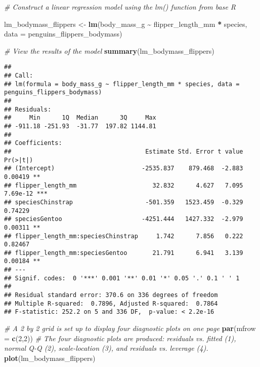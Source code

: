 \documentclass[
]{article}
\newenvironment{Shaded}{\begin{snugshade}}{\end{snugshade}}
\newcommand{\AttributeTok}[1]{\textcolor[rgb]{0.13,0.29,0.53}{#1}}
\newcommand{\CommentTok}[1]{\textcolor[rgb]{0.56,0.35,0.01}{\textit{#1}}}
\newcommand{\DecValTok}[1]{\textcolor[rgb]{0.00,0.00,0.81}{#1}}
\newcommand{\FunctionTok}[1]{\textcolor[rgb]{0.13,0.29,0.53}{\textbf{#1}}}
\newcommand{\NormalTok}[1]{#1}
\newcommand{\OtherTok}[1]{\textcolor[rgb]{0.56,0.35,0.01}{#1}}
\newcommand{\SpecialCharTok}[1]{\textcolor[rgb]{0.81,0.36,0.00}{\textbf{#1}}}
\begin{document}
\begin{Shaded}
\begin{Highlighting}[]
\CommentTok{\# Construct a linear regression model using the lm() function from base R}

\NormalTok{lm\_bodymass\_flippers }\OtherTok{\textless{}{-}} \FunctionTok{lm}\NormalTok{(body\_mass\_g }\SpecialCharTok{\textasciitilde{}}\NormalTok{ flipper\_length\_mm }\SpecialCharTok{*}\NormalTok{ species, }\AttributeTok{data =}\NormalTok{ penguins\_flippers\_bodymass)}

\CommentTok{\# View the results of the model}
\FunctionTok{summary}\NormalTok{(lm\_bodymass\_flippers)}
\end{Highlighting}
\end{Shaded}

\begin{verbatim}
## 
## Call:
## lm(formula = body_mass_g ~ flipper_length_mm * species, data = penguins_flippers_bodymass)
## 
## Residuals:
##     Min      1Q  Median      3Q     Max 
## -911.18 -251.93  -31.77  197.82 1144.81 
## 
## Coefficients:
##                                     Estimate Std. Error t value Pr(>|t|)    
## (Intercept)                        -2535.837    879.468  -2.883  0.00419 ** 
## flipper_length_mm                     32.832      4.627   7.095 7.69e-12 ***
## speciesChinstrap                    -501.359   1523.459  -0.329  0.74229    
## speciesGentoo                      -4251.444   1427.332  -2.979  0.00311 ** 
## flipper_length_mm:speciesChinstrap     1.742      7.856   0.222  0.82467    
## flipper_length_mm:speciesGentoo       21.791      6.941   3.139  0.00184 ** 
## ---
## Signif. codes:  0 '***' 0.001 '**' 0.01 '*' 0.05 '.' 0.1 ' ' 1
## 
## Residual standard error: 370.6 on 336 degrees of freedom
## Multiple R-squared:  0.7896, Adjusted R-squared:  0.7864 
## F-statistic: 252.2 on 5 and 336 DF,  p-value: < 2.2e-16
\end{verbatim}

\begin{Shaded}
\begin{Highlighting}[]
\CommentTok{\# A 2 by 2 grid is set up to display four diagnostic plots on one page }
\FunctionTok{par}\NormalTok{(}\AttributeTok{mfrow =} \FunctionTok{c}\NormalTok{(}\DecValTok{2}\NormalTok{,}\DecValTok{2}\NormalTok{)) }
\CommentTok{\# The four diagnostic plots are produced: residuals vs. fitted (1), normal Q{-}Q (2), scale{-}location (3), and residuals vs. leverage (4).}
\FunctionTok{plot}\NormalTok{(lm\_bodymass\_flippers)}
\end{Highlighting}
\end{Shaded}
\end{document}
